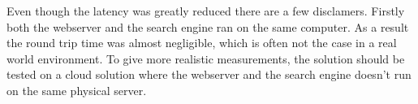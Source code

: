 Even though the latency was greatly reduced there are a few disclamers.
Firstly both the webserver and the search engine ran on the same computer.
As a result the round trip time was almost negligible, which is often not the case in a real world environment.
To give more realistic measurements, the solution should be tested on a cloud solution where the webserver and the search engine doesn't run on the same physical server.
